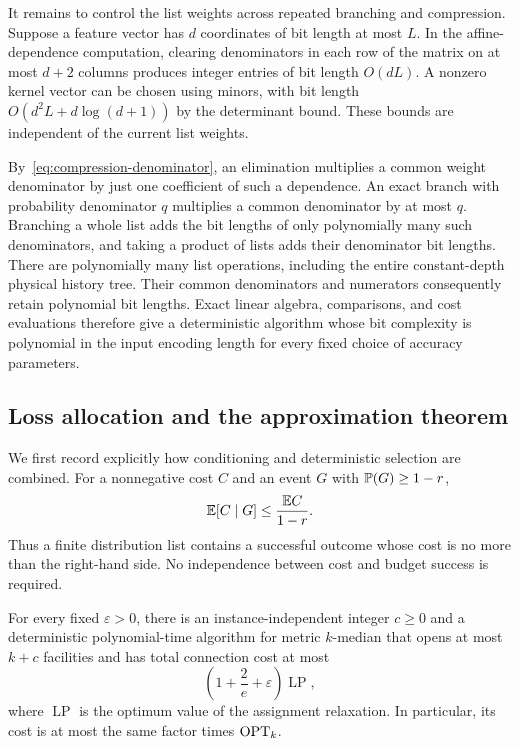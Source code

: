 It remains to control the list weights across repeated branching and
compression. Suppose a feature vector has \(d\) coordinates of bit
length at most \(L\). In the affine-dependence computation, clearing
denominators in each row of the matrix on at most \(d+2\) columns
produces integer entries of bit length \(O(dL)\). A nonzero kernel
vector can be chosen using minors, with bit length
\(O(d^2L+d\log(d+1))\) by the determinant bound. These bounds are
independent of the current list weights.

By~\eqref{eq:compression-denominator}, an elimination multiplies a
common weight denominator by just one coefficient of such a
dependence. An exact branch with probability denominator \(q\)
multiplies a common denominator by at most \(q\). Branching a whole
list adds the bit lengths of only polynomially many such
denominators, and taking a product of lists adds their denominator
bit lengths. There are polynomially many list operations, including
the entire constant-depth physical history tree. Their common
denominators and numerators consequently retain polynomial bit
lengths. Exact linear algebra, comparisons, and cost evaluations
therefore give a deterministic algorithm whose bit complexity is
polynomial in the input encoding length for every fixed choice of
accuracy parameters.

\subsection{Loss allocation and the approximation theorem}

We first record explicitly how conditioning and deterministic
selection are combined. For a nonnegative cost \(C\) and an event
\(G\) with \(\mathbb P(G)\ge1-r\),
\begin{equation}
 \mathbb E[C\mid G]
 \le\frac{\mathbb E C}{1-r}.
 \label{eq:conditioning-cost}
\end{equation}
Thus a finite distribution list contains a successful outcome whose
cost is no more than the right-hand side. No independence between
cost and budget success is required.

\begin{theorem}
\label{thm:pseudo}
For every fixed \(\varepsilon>0\), there is an
instance-independent integer \(c\ge0\) and a deterministic
polynomial-time algorithm for metric \(k\)-median that opens at
most \(k+c\) facilities and has total connection cost at most
\[
 \left(1+\frac2e+\varepsilon\right)\operatorname{LP},
\]
where \(\operatorname{LP}\) is the optimum value of the assignment
relaxation. In particular, its cost is at most the same factor times
\(\operatorname{OPT}_k\).
\end{theorem}

